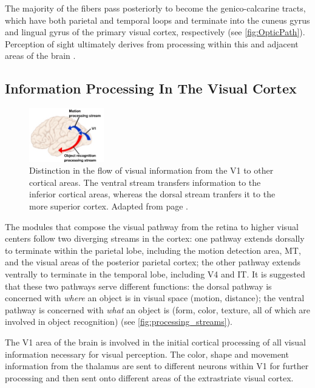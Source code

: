 The majority of the fibers pass posteriorly to become the genico-calcarine tracts, which have both parietal and temporal loops and terminate into the cuneus gyrus and lingual gyrus of the primary visual cortex, respectively (see \autoref{fig:OpticPath}). Perception of sight ultimately derives from processing within this and adjacent areas of the brain \cite{Gupta2022}.

\subsection{Information Processing In The Visual Cortex}

\begin{figure}
	\centering
	\includegraphics[width = 0.29\textwidth]{assets/images/Info_distinction_from_vis_cortex.jpg}
	\caption[Visual Information Flow Bifurcation]{Distinction in the flow of visual information from the \gls{V1} to other cortical areas. The ventral stream transfers information to the inferior cortical areas, whereas the dorsal stream tranfers it to the more superior cortex. Adapted from page \cite{optic_nerve}. }
	\label{fig:processing_streams}
\end{figure}

The modules that compose the visual pathway from the retina to higher visual centers follow two diverging streams in the cortex: one pathway extends dorsally to terminate within the parietal lobe, including the motion detection area, \gls{MT}, and the visual areas of the posterior parietal cortex; the other pathway extends ventrally to terminate in the temporal lobe, including \gls{V4} and \gls{IT}. It is suggested \cite{Mishkin1983} that these two pathways serve different functions: the dorsal pathway is concerned with \textit{where} an object is in visual space (motion, distance); the ventral pathway is concerned with \textit{what} an object is (form, color, texture, all of which are involved in object recognition) (see \autoref{fig:processing_streams}).

The \gls{V1} area of the brain is involved in the initial cortical processing of all visual information necessary for visual perception. The color, shape and movement information from the thalamus are sent to different neurons within \gls{V1} for further processing and then sent onto different areas of the extrastriate visual cortex. 


